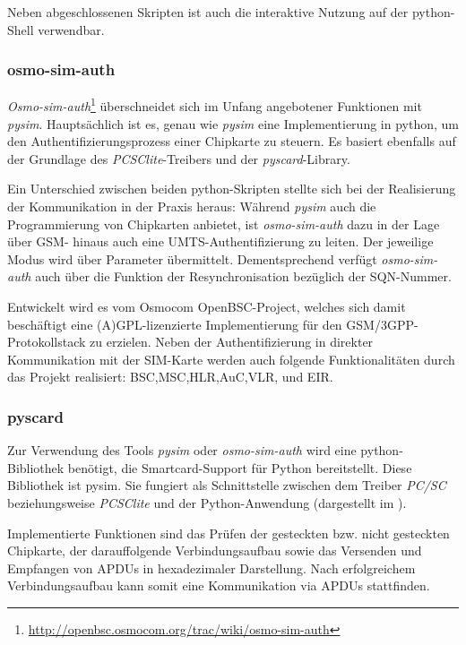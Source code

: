Neben abgeschlossenen Skripten ist auch die interaktive Nutzung auf der
python-Shell verwendbar.

\subsubsection{osmo-sim-auth}
\label{subsec:osmosim}
\textit{Osmo-sim-auth}\footnote{\url{http://openbsc.osmocom.org/trac/wiki/osmo-sim-auth}}
überschneidet sich im Unfang angebotener Funktionen mit \textit{pysim}. Hauptsächlich ist es,
genau wie \textit{pysim} eine Implementierung in python, um den Authentifizierungsprozess
einer Chipkarte zu steuern. Es basiert ebenfalls auf der Grundlage des
\textit{PCSClite}-Treibers und der \textit{pyscard}-Library.

Ein Unterschied zwischen beiden python-Skripten stellte sich bei der
Realisierung der Kommunikation in der Praxis heraus:
Während \textit{pysim} auch die Programmierung von Chipkarten anbietet, ist
\textit{osmo-sim-auth} dazu in der Lage über \ac{GSM}- hinaus auch
eine \ac{UMTS}-Authentifizierung zu leiten.
Der jeweilige Modus wird über Parameter übermittelt.
Dementsprechend verfügt \textit{osmo-sim-auth} auch über die Funktion der
Resynchronisation bezüglich der \ac{SQN}-Nummer\cite{osmosimweb}.

Entwickelt wird es vom Osmocom OpenBSC-Project, welches sich damit
beschäftigt eine (A)GPL-lizenzierte Implementierung für den
GSM/3GPP-Protokollstack zu erzielen. Neben der Authentifizierung
in direkter Kommunikation mit der SIM-Karte werden auch folgende
Funktionalitäten durch das Projekt realisiert:
\ac{BSC},\ac{MSC},\ac{HLR},\ac{AuC},\ac{VLR}, und \ac{EIR}\cite{osmocombscweb}.

\subsubsection{pyscard}
\label{pyscard}
Zur Verwendung des Tools \textit{pysim} oder \textit{osmo-sim-auth} wird eine python-Bibliothek benötigt,
die Smartcard-Support für Python bereitstellt. Diese Bibliothek
ist pysim. Sie fungiert als Schnittstelle zwischen dem Treiber \textit{PC/SC}
beziehungsweise \textit{PCSClite} und der Python-Anwendung 
(dargestellt im ).

Implementierte Funktionen sind das Prüfen der gesteckten bzw. nicht gesteckten
Chipkarte, der darauffolgende Verbindungsaufbau sowie das Versenden und
Empfangen von APDUs in hexadezimaler Darstellung.
Nach erfolgreichem Verbindungsaufbau kann somit eine Kommunikation via
APDUs stattfinden.

